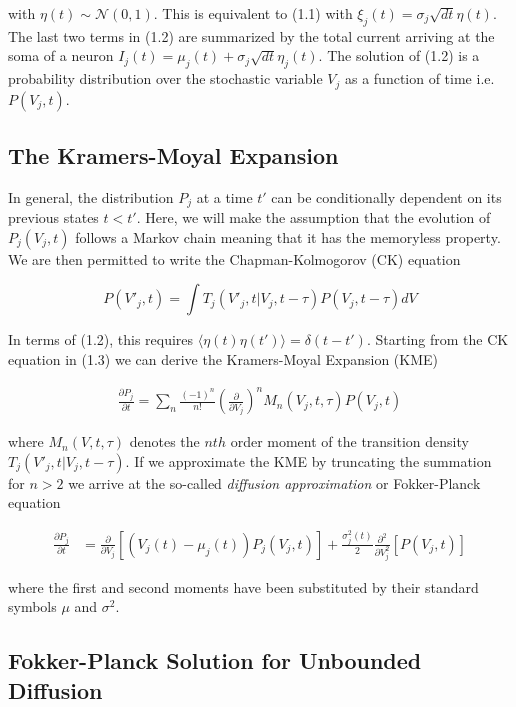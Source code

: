 \documentclass{ucetd}
\begin{document}
with $\eta(t) \sim \mathcal{N}(0,1)$. This is equivalent to (1.1) with $\xi_{j}(t) = \sigma_{j}\sqrt{dt}\eta(t)$. The last two terms in (1.2) are summarized by the total current arriving at the soma of a neuron $I_{j}(t) = \mu_{j}(t) + \sigma_{j}\sqrt{dt}\eta_{j}(t)$. The solution of (1.2) is a probability distribution over the stochastic variable $V_{j}$ as a function of time i.e. $P(V_{j},t)$. 

\subsection{The Kramers-Moyal Expansion}

In general, the distribution $P_{j}$ at a time $t'$ can be conditionally dependent on its previous states $t < t'$. Here, we will make the assumption that the evolution of $P_{j}(V_{j},t)$ follows a Markov chain meaning that it has the memoryless property. We are then permitted to write the Chapman-Kolmogorov (CK) equation

\begin{equation}
P(V'_{j}, t) = \int T_{j}(V'_{j}, t | V_{j}, t-\tau)P(V_{j}, t-\tau)dV
\end{equation} 

In terms of (1.2), this requires $\langle\eta(t)\eta(t')\rangle = \delta(t-t')$. Starting from the CK equation in (1.3) we can derive the Kramers-Moyal Expansion (KME) 

\begin{align}
\frac{\partial P_{j}}{\partial t} = \sum_{n} \frac{(-1)^{n}}{n!} \left(\frac{\partial}{\partial V_{j}}\right)^{n} M_{n}(V_{j},t,\tau) P(V_{j},t)
\end{align}

where $M_{n}(V,t,\tau)$ denotes the $nth$ order moment of the transition density $T_{j}(V'_{j}, t | V_{j}, t-\tau)$. If we approximate the KME by truncating the summation for $n > 2$ we arrive at the so-called \emph{diffusion approximation} or Fokker-Planck equation

\begin{align}
\frac{\partial P_{j}}{\partial t} &= \frac{\partial}{\partial V_{j}}[\left(V_{j}(t)-\mu_{j}(t)\right) P_{j}(V_{j},t)] + \frac{\sigma_{j}^{2}(t)}{2}\frac{\partial^{2}}{\partial V_{j}^{2}}[P(V_{j},t)]
\end{align}

where the first and second moments have been substituted by their standard symbols $\mu$ and $\sigma^{2}$.

\subsection{Fokker-Planck Solution for Unbounded Diffusion}
\end{document}
